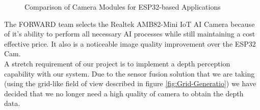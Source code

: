 \begin{figure}[H]
	\centering
	\setlength{\tabcolsep}{5pt} %
	\renewcommand{\arraystretch}{1.75} %
	\caption{\label{fig:compareCameras}Comparison of Camera Modules for ESP32-based Applications}
\end{figure}

\noindent The FORWARD team selects the Realtek AMB82-Mini IoT AI Camera because of it's ability to perform all necessary AI processes while still maintaining a cost effective price. It also is a noticeable image quality improvement over the ESP32 Cam. \\

\noindent A stretch requirement of our project is to implement a depth perception capability with our system. Due to the sensor fusion solution that we are taking (using the grid-like field of view described in figure \ref{fig:Grid-Generatio}) we have decided that we no longer need a high quality of camera to obtain the depth data. \\

